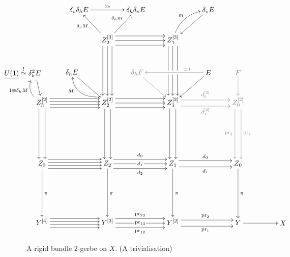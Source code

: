 \documentclass[12pt]{amsart}
\DeclareMathOperator{\pr}{pr}
\theoremstyle{plain}
\theoremstyle{definition}
\theoremstyle{remark}
\numberwithin{equation}{section}
\newcommand{\<}{\langle}
\renewcommand{\>}{\rangle}
\begin{document}
\begin{figure}[b]
\[
 \centerline{
  \xymatrix@=16ex{
    &
    \save 
      []+<-4em,10ex>  
      *+{\delta_v\delta_h E}="dvdh" 
      \ar@{<-}[]_-(.4){\delta_vM} 
    \restore
    \save 
      []+<4em,10ex> 
      *+{ \delta_h\delta_v E}="dhdv" 
      \ar@{<-}[]_-(.4){\delta_hm}
    \restore
    \ar@{->}"dvdh";"dhdv"^{!\simeq} %
    Z_2^{[3]}   
    \ar@<1.5ex>[r] \ar@<-1.5ex>[r] \ar[r] \ar@<1.5ex>[d] \ar@<-1.5ex>[d] \ar[d] 
    &
    Z_1^{[3]} 
    \save 
      []+<5em,10ex> 
      *+{\delta_v E} 
      \ar[] \ar@{<-}@/_1pc/[]_{m} %
    \restore 
    & 
    \\
    Z_3^{[2]} 
    \ar@<1ex>[d] \ar@<-1ex>[d] \ar@<1.5ex>[r] \ar@<-1.5ex>[r] \ar@<-0.5ex>[r]\ar@<0.5ex>[r]
    \save 
      []+<-1em,10ex> 
      *+[l]{\underline{U(1)}\stackrel{!}{\simeq}\delta_h^2 E} 
      \ar[] \ar@{<-}@/_1pc/[]_{1\equiv \delta_hM} %
    \restore 
    &
    Z_2^{[2]} 
    \ar@<1ex>[d] \ar@<-1ex>[d] \ar@<1.5ex>[r] \ar@<-1.5ex>[r] \ar[r] 
    \save
      []+<-5em,10ex> 
      *+{\delta_h E}  
      \ar[]+<-1em,2ex> \ar@{<-}@/_1pc/[]+<-1.5em,2ex>_(0.4){M} %
    \restore 
    &  
    \save 
      []+<5em,10ex> 
      *+{E}="2gerbe"  %
      \ar[]+<1em,2ex>
    \restore 
    \save 
      []+<-5em,10ex> 
      *+{{\color{gray}\delta_h F}}="deltatrivbg"  %
      \ar@*{[gray]}[]+<-1em,2ex>
    \restore 
    \ar@*{[gray]}@{->}"2gerbe";"deltatrivbg"_(.3){\color{gray}\simeq\,t} %
    \ar@<1.5ex>[u];[]|!{"2gerbe";"deltatrivbg"}{\hole}
    \ar@<-1.5ex>[u];[]|!{"2gerbe";"deltatrivbg"}{\hole} 
    \ar[u];[]|!{"2gerbe";"deltatrivbg"}{\hole}
    Z_1^{[2]}
    \ar@<1ex>[d] \ar@<-1ex>[d] \ar@*{[gray]}@<1ex>[r]^-{\color{gray}d_0^{[2]}} \ar@*{[gray]}@<-1ex>[r]_-{\color{gray}d_1^{[2]}}
    & 
    {\color{gray}Z_0^{[2]} }
    \ar@*{[gray]}@<-1ex>@<1ex>[d]^{\color{gray}\pr_1} \ar@*{[gray]}@<-1ex>@<-1ex>[d]_{\color{gray}\pr_2}
    \save 
      []+<0em,10ex> 
      *+{\color{gray}F}  %
      \ar@*{[gray]}[] 
    \restore  
    \\
    Z_3 
    \ar[d]^{\pi} \ar@<1.5ex>[r] \ar@<-1.5ex>[r] \ar@<-0.5ex>[r]\ar@<0.5ex>[r]
    &
    Z_2 
    \ar@<1.5ex>[r]^{d_0} \ar[r]|{\,d_1\,} \ar@<-1.5ex>[r]_{d_2} \ar[d]^{\pi}
    & 
    Z_1 
    \ar@<-1ex>@<1ex>[r]^{d_0} \ar@<-1ex>@<-1ex>[r]_{d_1} \ar[d]^{\pi}
    &
    {Z_0} 
    \ar[d]^{\pi} 
    \\
    Y^{[4]}
    \ar@<1.5ex>[r] \ar@<-1.5ex>[r] \ar@<-0.5ex>[r]\ar@<0.5ex>[r] 
    &
    Y^{[3]}
    \ar@<1.5ex>[r]^{\pr_{23}} \ar[r]|{\,\pr_{13}\,} \ar@<-1.5ex>[r]_{\pr_{12}}
    & 
    Y^{[2]}
    \ar@<1ex>[r]^{\pr_2} \ar@<-1ex>[r]_{\pr_1}
    & 
    Y
    & 
    \save 
      []+<-2em,0pt> 
      *+{X} 
      \ar@{<-}[l]
    \restore
  }
 }
\]
\vspace{1cm}
\caption{A rigid bundle 2-gerbe on $X$. {\color{gray}(A trivialisation)}}\label{fig:verystrictb2g}
\end{figure}
\end{document}
